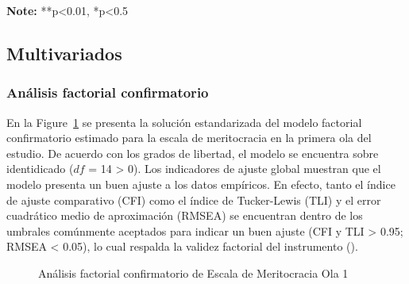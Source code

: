 \documentclass[
  12pt,
]{article}
\begin{document}
\begin{longtable}[]
\end{longtable}

\textbf{Note:} **p\textless0.01, *p\textless0.5

\subsection{Multivariados}\label{multivariados}

\subsubsection{Análisis factorial
confirmatorio}\label{anuxe1lisis-factorial-confirmatorio}

En la Figure~\ref{fig-cfa1} se presenta la solución estandarizada del
modelo factorial confirmatorio estimado para la escala de meritocracia
en la primera ola del estudio. De acuerdo con los grados de libertad, el
modelo se encuentra sobre identidicado (\(df\) = 14 \textgreater{} 0).
Los indicadores de ajuste global muestran que el modelo presenta un buen
ajuste a los datos empíricos. En efecto, tanto el índice de ajuste
comparativo (CFI) como el índice de Tucker-Lewis (TLI) y el error
cuadrático medio de aproximación (RMSEA) se encuentran dentro de los
umbrales comúnmente aceptados para indicar un buen ajuste (CFI y TLI
\textgreater{} 0.95; RMSEA \textless{} 0.05), lo cual respalda la
validez factorial del instrumento
().

\begin{figure}

\caption{\label{fig-cfa1}Análisis factorial confirmatorio de Escala de
Meritocracia Ola 1}


\end{figure}%
\end{document}
